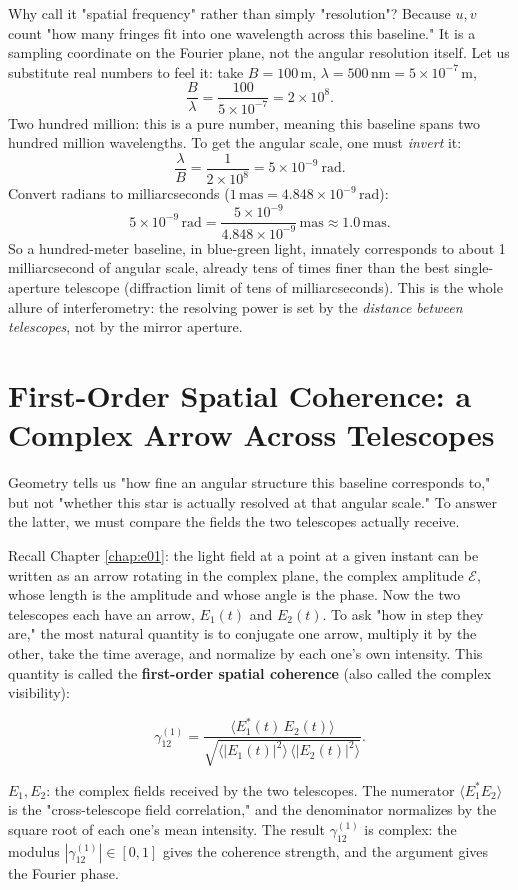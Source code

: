 Why call it "spatial frequency" rather than simply "resolution"? Because \(u,v\) count "how many fringes fit into one wavelength across this baseline." It is a sampling coordinate on the Fourier plane, not the angular resolution itself. Let us substitute real numbers to feel it: take \(B=100\,\mathrm{m}\), \(\lambda=500\,\mathrm{nm}=5\times10^{-7}\,\mathrm{m}\),
\[
  \frac{B}{\lambda}=\frac{100}{5\times10^{-7}}=2\times10^{8}.
\]
Two hundred million: this is a pure number, meaning this baseline spans two hundred million wavelengths. To get the angular scale, one must \emph{invert} it:
\[
  \frac{\lambda}{B}=\frac{1}{2\times10^{8}}=5\times10^{-9}\ \mathrm{rad}.
\]
Convert radians to milliarcseconds (\(1\,\mathrm{mas}=4.848\times10^{-9}\,\mathrm{rad}\)):
\[
  5\times10^{-9}\,\mathrm{rad}=\frac{5\times10^{-9}}{4.848\times10^{-9}}\,\mathrm{mas}\approx1.0\,\mathrm{mas}.
\]
So a hundred-meter baseline, in blue-green light, innately corresponds to about 1 milliarcsecond of angular scale, already tens of times finer than the best single-aperture telescope (diffraction limit of tens of milliarcseconds). This is the whole allure of interferometry: the resolving power is set by the \emph{distance between telescopes}, not by the mirror aperture.

\section{First-Order Spatial Coherence: a Complex Arrow Across Telescopes}
\label{sec:e10-gamma12}

Geometry tells us "how fine an angular structure this baseline corresponds to," but not "whether this star is actually resolved at that angular scale." To answer the latter, we must compare the fields the two telescopes actually receive.

Recall Chapter \ref{chap:e01}: the light field at a point at a given instant can be written as an arrow rotating in the complex plane, the complex amplitude \(\mathcal E\), whose length is the amplitude and whose angle is the phase. Now the two telescopes each have an arrow, \(E_1(t)\) and \(E_2(t)\). To ask "how in step they are," the most natural quantity is to conjugate one arrow, multiply it by the other, take the time average, and normalize by each one's own intensity. This quantity is called the \textbf{first-order spatial coherence} (also called the complex visibility):

\begin{equation}
  \gamma_{12}^{(1)}
  =\frac{\big\langle E_1^{\ast}(t)\,E_2(t)\big\rangle}
        {\sqrt{\big\langle|E_1(t)|^2\big\rangle\,\big\langle|E_2(t)|^2\big\rangle}} .
  \label{eq:e10-gamma12}
\end{equation}
\begin{formulaexplain}
\(E_1,E_2\): the complex fields received by the two telescopes. The numerator \(\langle E_1^{\ast}E_2\rangle\) is the "cross-telescope field correlation," and the denominator normalizes by the square root of each one's mean intensity. The result \(\gamma_{12}^{(1)}\) is complex: the modulus \(|\gamma_{12}^{(1)}|\in[0,1]\) gives the coherence strength, and the argument gives the Fourier phase.
\end{formulaexplain}

